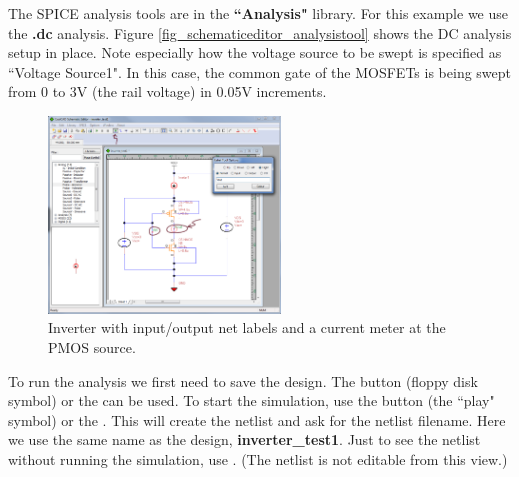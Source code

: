  The SPICE analysis tools are in the \textbf{``Analysis"} library.  For this example we use the \textsf{\textbf{.dc}} analysis.    Figure \ref{fig_schematiceditor_analysistool} shows the DC analysis setup in place.  Note especially how the voltage source to be swept is specified as ``Voltage Source1".  In this case, the common gate of the MOSFETs is being swept from 0 to 3V (the rail voltage) in 0.05V increments.


\begin{figure}
    \includegraphics[width=0.55\textwidth]{./figures/getting_started_figures/SchematicEditor_labeling_and_Isense.png}
    \caption{Inverter with input/output net labels and a current meter at the PMOS source.}
  \label{fig_schematiceditor_sensetools}
\end{figure} 

 To run the analysis we first need to save the design.  The  button (floppy disk symbol) or the  can be used.  To start the simulation, use the  button  (the ``play" symbol) or the .  This will create the netlist and ask for the netlist filename.  Here we use the same name as the design, \textsf{\textbf{inverter\_test1}}.  Just to see the netlist without running the simulation, use .  (The netlist is not editable from this view.)

